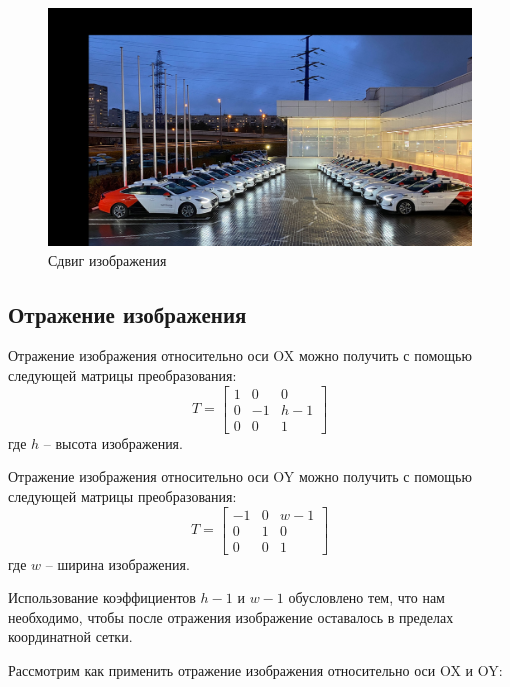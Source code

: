 \begin{figure}[ht]
    \includegraphics[width=\textwidth]{../outputs/image_shift.png}
    \caption{Сдвиг изображения}
    \label{fig:move_image}
\end{figure}

\subsection{Отражение изображения}

Отражение изображения относительно оси OX можно получить с помощью следующей матрицы преобразования:
\begin{equation}
T = \begin{bmatrix}
    1 & 0 & 0 \\
    0 & -1 & h - 1 \\
    0 & 0 & 1
\end{bmatrix}
\end{equation}
где $h$ -- высота изображения.

Отражение изображения относительно оси OY можно получить с помощью следующей матрицы преобразования:
\begin{equation}
T = \begin{bmatrix}
    -1 & 0 & w - 1 \\
    0 & 1 & 0 \\
    0 & 0 & 1
\end{bmatrix}  
\end{equation}
где $w$ -- ширина изображения.

Использование коэффициентов $h - 1$ и $w - 1$ обусловлено тем, что нам необходимо, чтобы после отражения изображение оставалось в пределах координатной сетки.


Рассмотрим как применить отражение изображения относительно оси OX и OY:

